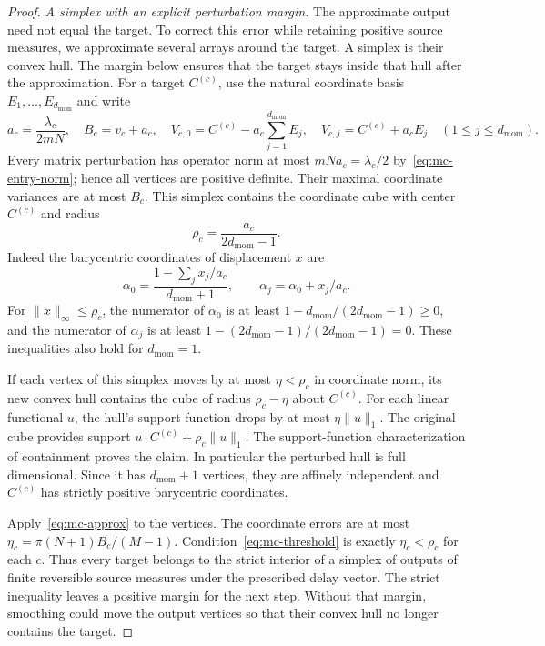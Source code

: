\begin{proof}
\emph{A simplex with an explicit perturbation margin.}
The approximate output need not equal the target. To correct this error while retaining positive source measures, we approximate several arrays around the target. A simplex is their convex hull. The margin below ensures that the target stays inside that hull after the approximation.
For a target $C^{(c)}$, use the natural coordinate basis $E_1,\ldots,E_{d_{\mathrm{mom}}}$
and write
\[
 a_c=\frac{\lambda_c}{2mN},\quad
 B_c=v_c+a_c,\quad
 V_{c,0}=C^{(c)}-a_c\sum_{j=1}^{d_{\mathrm{mom}}} E_j,\quad
 V_{c,j}=C^{(c)}+a_cE_j\quad(1\le j\le d_{\mathrm{mom}}).
\]
Every matrix perturbation has operator norm at most $mNa_c=\lambda_c/2$
by~\eqref{eq:mc-entry-norm}; hence all vertices are positive definite.
Their maximal coordinate variances are at most $B_c$.
This simplex contains the coordinate cube with center $C^{(c)}$ and
radius
\begin{equation}\label{eq:mc-radius}
 \rho_c=\frac{a_c}{2d_{\mathrm{mom}}-1}.
\end{equation}
Indeed the barycentric coordinates of displacement $x$ are
\[
 \alpha_0=\frac{1-\sum_j x_j/a_c}{d_{\mathrm{mom}}+1},\qquad
 \alpha_j=\alpha_0+x_j/a_c.
\]
For $\|x\|_\infty\le\rho_c$, the numerator of $\alpha_0$ is at least
$1-d_{\mathrm{mom}}/(2d_{\mathrm{mom}}-1)\ge0$, and the numerator of $\alpha_j$ is at least
$1-(2d_{\mathrm{mom}}-1)/(2d_{\mathrm{mom}}-1)=0$. These inequalities also hold for $d_{\mathrm{mom}}=1$.

If each vertex of this simplex moves by at most $\eta<\rho_c$ in
coordinate norm, its new convex hull contains the cube of radius
$\rho_c-\eta$ about $C^{(c)}$. For each linear functional $u$, the hull's support function drops by at most
$\eta\|u\|_1$. The original cube provides support
$u\cdot C^{(c)}+\rho_c\|u\|_1$. The
support-function characterization of containment proves the claim.
In particular the perturbed hull is full dimensional. Since it has
$d_{\mathrm{mom}}+1$ vertices, they are affinely independent and $C^{(c)}$ has strictly
positive barycentric coordinates.

Apply~\eqref{eq:mc-approx} to the vertices. The coordinate errors are at
most $\eta_c=\pi(N+1)B_c/(M-1)$. Condition~\eqref{eq:mc-threshold} is
exactly $\eta_c<\rho_c$ for each $c$. Thus every target belongs to the
strict interior of a simplex of outputs of finite reversible source
measures under the prescribed delay vector. The strict inequality leaves a positive margin for the next step. Without that margin, smoothing could move the output vertices so that their convex hull no longer contains the target.


\end{proof}
